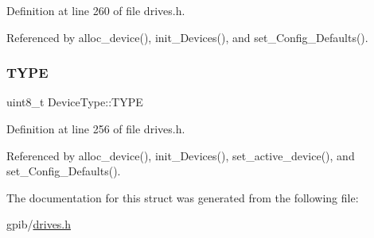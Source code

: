 Definition at line 260 of file drives.\+h.



Referenced by alloc\+\_\+device(), init\+\_\+\+Devices(), and set\+\_\+\+Config\+\_\+\+Defaults().

\mbox{\label{structDeviceType_acee5219162b6f47a9423b2086d127ede}} 
\subsubsection{\texorpdfstring{T\+Y\+PE}{TYPE}}
{\footnotesize\ttfamily uint8\+\_\+t Device\+Type\+::\+T\+Y\+PE}



Definition at line 256 of file drives.\+h.



Referenced by alloc\+\_\+device(), init\+\_\+\+Devices(), set\+\_\+active\+\_\+device(), and set\+\_\+\+Config\+\_\+\+Defaults().



The documentation for this struct was generated from the following file\+:\begin{DoxyCompactItemize}
\item 
gpib/\hyperlink{drives_8h}{drives.\+h}\end{DoxyCompactItemize}
